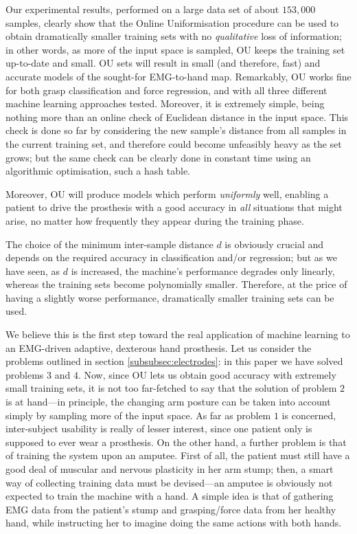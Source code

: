 Our experimental results, performed on a large data set of about
$153,000$ samples, clearly show that the Online Uniformisation
procedure can be used to obtain dramatically smaller training sets
with no \emph{qualitative} loss of information; in other words, as
more of the input space is sampled, OU keeps the training set
up-to-date and small. OU sets will result in small (and therefore,
fast) and accurate models of the sought-for EMG-to-hand
map. Remarkably, OU works fine for both grasp classification and force
regression, and with all three different machine learning approaches
tested. Moreover, it is extremely simple, being nothing more than an
online check of Euclidean distance in the input space. This check is
done so far by considering the new sample's distance from all samples
in the current training set, and therefore could become unfeasibly
heavy as the set grows; but the same check can be clearly done in
constant time using an algorithmic optimisation, such a hash table.

Moreover, OU will produce models which perform \emph{uniformly} well,
enabling a patient to drive the prosthesis with a good accuracy in
\emph{all} situations that might arise, no matter how frequently they
appear during the training phase.

The choice of the minimum inter-sample distance $d$ is obviously
crucial and depends on the required accuracy in classification and/or
regression; but as we have seen, as $d$ is increased, the machine's
performance degrades only linearly, whereas the training sets become
polynomially smaller. Therefore, at the price of having a slightly
worse performance, dramatically smaller training sets can be used.

We believe this is the first step toward the real application of
machine learning to an EMG-driven adaptive, dexterous hand
prosthesis. Let us consider the problems outlined in section
\ref{subsubsec:electrodes}: in this paper we have solved problems
$3$ and $4$. Now, since OU lets us obtain good accuracy with extremely
small training sets, it is not too far-fetched to say that the
solution of problem $2$ is at hand---in principle, the changing arm
posture can be taken into account simply by sampling more of the input
space. As far as problem $1$ is concerned, inter-subject usability is
really of lesser interest, since one patient only is supposed to ever
wear a prosthesis. On the other hand, a further problem is that of
training the system upon an amputee. First of all, the patient must
still have a good deal of muscular and nervous plasticity in her arm
stump; then, a smart way of collecting training data must be
devised---an amputee is obviously not expected to train the machine
with a hand. A simple idea is that of gathering EMG data from the
patient's stump and grasping/force data from her healthy hand, while
instructing her to imagine doing the same actions with both hands.

